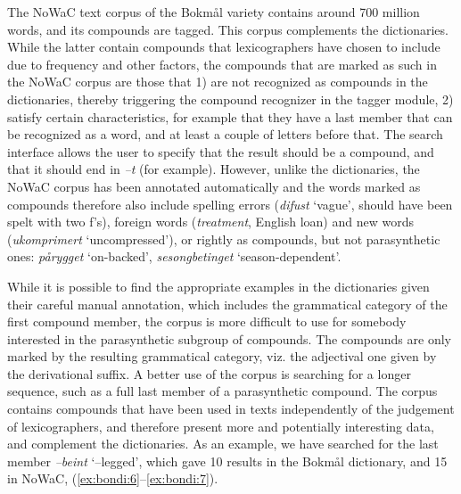 \documentclass[output=paper]{LSP/langsci}
\begin{document}
The NoWaC text corpus of the  Bokmål variety \citep{Guevara2010} contains around 700 million words, and its compounds are tagged. This corpus complements the dictionaries. While the latter contain compounds that lexicographers have chosen to include due to frequency and other factors, the compounds that are marked as such in the NoWaC corpus are those that 1) are not recognized as compounds in the dictionaries, thereby triggering the compound recognizer in the tagger module, 2) satisfy certain characteristics, for example that they have a last member that can be recognized as a word, and at least a couple of letters before that.  The search interface allows the user to specify that the result should be a compound, and that it should end in \textit{–t} (for example). However, unlike the dictionaries, the NoWaC corpus has been annotated automatically and the words marked as compounds therefore also include spelling errors (\textit{difust} ‘vague’, should have been spelt with two f’s), foreign words (\textit{treatment}, English loan) and new words (\textit{ukomprimert} ‘uncompressed’), or rightly as compounds, but not parasynthetic ones: \textit{pårygget} ‘on-backed’, \textit{sesongbetinget} ‘season-dependent’. 

While it is possible to find the appropriate examples in the dictionaries given their careful manual annotation, which includes the grammatical category of the first compound member, the corpus is more difficult to use for somebody interested in the parasynthetic subgroup of compounds. The compounds are only marked by the resulting grammatical category, viz. the adjectival one given by the derivational suffix. A better use of the corpus is searching for a longer sequence, such as a full last member of a parasynthetic compound. The corpus contains compounds that have been used in texts independently of the judgement of lexicographers, and therefore present more and potentially interesting data, and complement the dictionaries. As an example, we have searched for the last member \textit{–beint} ‘–legged’, which gave 10 results in the Bokmål dictionary, and 15 in NoWaC, (\ref{ex:bondi:6}–\ref{ex:bondi:7}).\largerpage[3]
\end{document}
